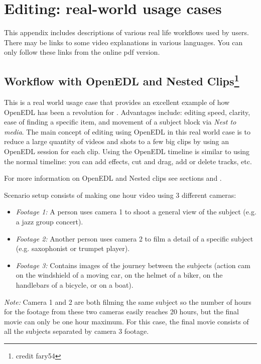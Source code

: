 \chapter{Editing: real-world usage cases}%
\label{cha:editing_real_world_usage}

This appendix includes descriptions of various real life workflows used by \CGG{} users. There may be links to some video explanations in various languages.
You can only follow these links from the online pdf version.


\section{Workflow with OpenEDL and Nested Clips\protect\footnote{credit fary54}}%
\label{sec:workflow_openedl_nested_clips}

This is a real world usage case that provides an excellent example of how OpenEDL has been a
revolution for \CGG{}. Advantages include: editing speed, clarity, ease of finding a specific item,
and movement of a subject block via \textit{Nest to media}.
The main concept of editing using OpenEDL in this real world case is to
reduce a large quantity of videos and shots to a few big clips by using
an OpenEDL session for each clip. Using the OpenEDL timeline is similar to
 using the normal timeline: you can add effects, cut and drag, add or delete
tracks, etc.

For more information on OpenEDL and Nested clips see sections  and .

Scenario setup consists of making one hour video using 3 different cameras:

\begin{itemize}
	\item \textit{Footage 1:} A person uses camera 1 to shoot a general view of the subject (e.g. a jazz group concert).
	\item \textit{Footage 2:} Another person uses camera 2 to film a detail of a specific subject (e.g. saxophonist or trumpet player).
	\item \textit{Footage 3:} Contains images of the journey between the subjects (action cam on the windshield of a moving car, on the helmet of a biker, on the handlebars of a bicycle, or on a boat).
\end{itemize}

\textit{Note:} Camera 1 and 2 are both filming the same subject so the number of hours for the footage from these two cameras easily reaches 20 hours, but the final movie can only be one hour maximum.  For this case, the final movie consists of all the subjects separated by camera 3 footage.


